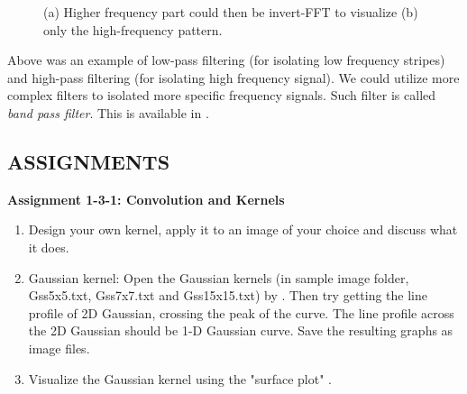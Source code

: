 \begin{figure}[htbp]
 \centering
 \caption{ (a) Higher frequency part could then be invert-FFT to visualize (b) only the high-frequency pattern.}
 \label{fig:invertToGetHighFrequencyImage}
\end{figure} 


Above was an example of low-pass filtering (for isolating low frequency
stripes) and high-pass filtering (for isolating high frequency signal).
We could utilize more complex filters to isolated more specific
frequency signals. Such filter is called \textit{band pass
filter}. This is
available in . 


\subsection{ASSIGNMENTS}

\textbf{\sffamily
Assignment 1-3-1: Convolution and Kernels
}

\begin{enumerate}
\item Design your own kernel, apply it to an image of your choice and
discuss what it does. 

\item Gaussian kernel: Open the Gaussian kernels (in sample image folder,
Gss5x5.txt, Gss7x7.txt and Gss15x15.txt) by . Then try getting the
line profile of 2D Gaussian, crossing the peak of the curve. The line
profile across the 2D Gaussian should be 1-D Gaussian curve. Save the
resulting graphs as image files. 

\item Visualize the Gaussian kernel using the "surface
plot" .
\end{enumerate}

